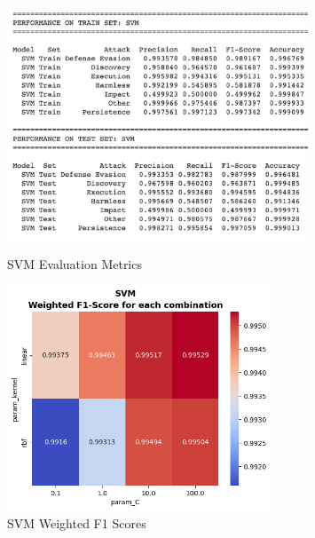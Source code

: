 \begin{figure}[H]
            \begin{minipage}{\textwidth}
                \begin{minipage}[c]{0.48\textwidth}
                    \centering
                    \includegraphics[width=0.8\textwidth]{../figures/plots/section2/SVM_evaluation_metrics_1.png}
                    \caption{SVM Evaluation Metrics}
                    \label{fig:svm_em_base}
                \end{minipage}%
                \hfill%
                \begin{minipage}[c]{0.48\textwidth}
                    \centering
                    \includegraphics[width=0.7\textwidth]{../figures/plots/section2/weighted_f1_score_for_each_combination_of_parameters_svm.png}
                    \caption{SVM Weighted F1 Scores}
                    \label{fig:svm_f1_tuning}
                \end{minipage}
            \end{minipage}
            

\end{figure}
